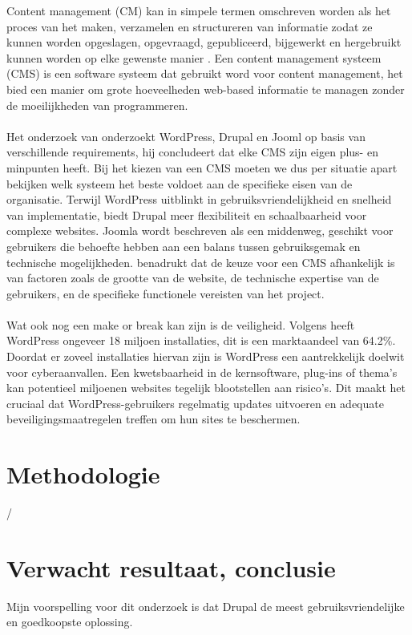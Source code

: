 
Content management (CM) kan in simpele termen omschreven worden als het proces van het maken, verzamelen en structureren van informatie zodat ze kunnen worden opgeslagen, opgevraagd, gepubliceerd, bijgewerkt en hergebruikt kunnen worden op elke gewenste manier \autocite{Sunny2008}. Een content management systeem (CMS) is een software systeem dat gebruikt word voor content management, het bied een manier om grote hoeveelheden web-based informatie te managen zonder de moeilijkheden van programmeren.
\\ \\
Het onderzoek van \textcite{Khalil2024} onderzoekt WordPress, Drupal en Jooml op basis van verschillende requirements, hij concludeert dat elke CMS zijn eigen plus- en minpunten heeft. Bij het kiezen van een CMS moeten we dus per situatie apart bekijken welk systeem het beste voldoet aan de specifieke eisen van de organisatie. Terwijl WordPress uitblinkt in gebruiksvriendelijkheid en snelheid van implementatie, biedt Drupal meer flexibiliteit en schaalbaarheid voor complexe websites. Joomla wordt beschreven als een middenweg, geschikt voor gebruikers die behoefte hebben aan een balans tussen gebruiksgemak en technische mogelijkheden. \textcite{Khalil2024} benadrukt dat de keuze voor een CMS afhankelijk is van factoren zoals de grootte van de website, de technische expertise van de gebruikers, en de specifieke functionele vereisten van het project.
\\ \\
Wat ook nog een make or break kan zijn is de veiligheid. Volgens \textcite{MarianVladut2021} heeft WordPress ongeveer 18 miljoen installaties, dit is een marktaandeel van 64.2\%. Doordat er zoveel installaties hiervan zijn is WordPress een aantrekkelijk doelwit voor cyberaanvallen. Een kwetsbaarheid in de kernsoftware, plug-ins of thema's kan potentieel miljoenen websites tegelijk blootstellen aan risico's. Dit maakt het cruciaal dat WordPress-gebruikers regelmatig updates uitvoeren en adequate beveiligingsmaatregelen treffen om hun sites te beschermen.




\section{Methodologie}%
\label{sec:methodologie}

/

\section{Verwacht resultaat, conclusie}%
\label{sec:verwachte_resultaten}

Mijn voorspelling voor dit onderzoek is dat Drupal de meest gebruiksvriendelijke en goedkoopste oplossing.